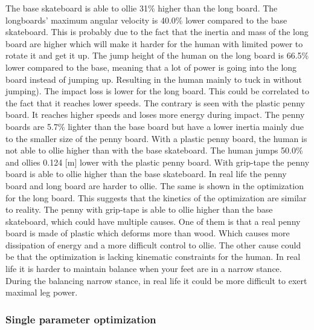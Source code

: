 \documentclass[default,iicol]{sn-jnl}
\begin{document}
{The base skateboard is able to ollie 31\% higher than the long board. The longboards' maximum angular velocity is 40.0\% lower compared to the base skateboard. This is probably due to the fact that the inertia and mass of the long board are higher which will make it harder for the human with limited power to rotate it and get it up. The jump height of the human on the long board is 66.5\% lower compared to the base, meaning that a lot of power is going into the long board instead of jumping up. Resulting in the human mainly to tuck in without jumping). The impact loss is lower for the long board. This could be correlated to the fact that it reaches lower speeds. The contrary is seen with the plastic penny board. It reaches higher speeds and loses more energy during impact. The penny boards are 5.7\% lighter than the base board but have a lower inertia mainly due to the smaller size of the penny board. With a plastic penny board, the human is not able to ollie higher than with the base skateboard. The human jumps 50.0\% and ollies 0.124 [m] lower with the plastic penny board. With grip-tape the penny board is able to ollie higher than the base skateboard. In real life the penny board and long board are harder to ollie. The same is shown in the optimization for the long board. This suggests that the kinetics of the optimization are similar to reality. The penny with grip-tape is able to ollie higher than the base skateboard, which could have multiple causes. One of them is that a real penny board is made of plastic which deforms more than wood. Which causes more dissipation of energy and a more difficult control to ollie. The other cause could be that the optimization is lacking kinematic constraints for the human. In real life it is harder to maintain balance when your feet are in a narrow stance. During the balancing narrow stance, in real life it could be more difficult to exert maximal leg power.

\subsubsection{Single parameter optimization}

}
\end{document}
